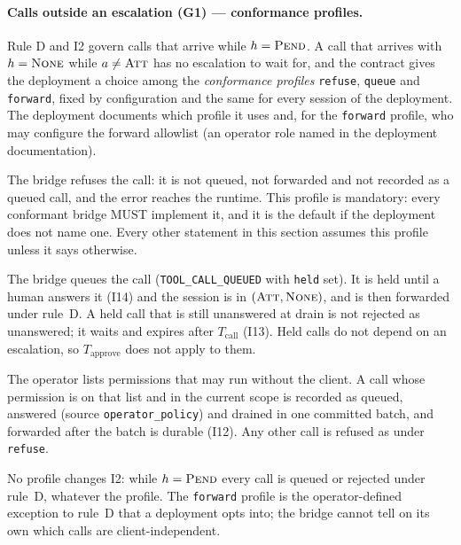 \paragraph{Calls outside an escalation (G1) --- conformance profiles.}
Rule D and I2 govern calls
that arrive while $h=\textsc{Pend}$. A call that arrives with
$h=\textsc{None}$ while $a\neq\textsc{Att}$ has no escalation to wait for,
and the contract gives the deployment a choice among the
\emph{conformance profiles} \texttt{refuse}, \texttt{queue} and
\texttt{forward}, fixed by configuration
and the same for every session of the deployment. The deployment
documents which profile it uses and, for the \texttt{forward} profile,
who may configure the forward allowlist (an operator role named in the
deployment documentation).
\begin{description}[leftmargin=2em]
\item[\texttt{refuse} (mandatory default).] The bridge refuses the call: it is not
queued, not forwarded and not recorded as a queued call, and the error
reaches the runtime. This profile is mandatory: every conformant
bridge MUST implement it, and it is the default if the deployment does
not name one. Every other statement in
this section assumes this profile unless it says otherwise.
\item[\texttt{queue} (optional).] The bridge queues the call
(\texttt{TOOL\_CALL\_QUEUED} with \texttt{held} set). It is held until a
human answers it (I14) and the session is in $(\textsc{Att},\textsc{None})$,
and is then forwarded under rule~D. A held call that is still unanswered
at drain is not rejected as unanswered; it waits and expires after
$T_{\text{call}}$ (I13). Held calls do not depend on an escalation, so
$T_{\text{approve}}$ does not apply to them.
\item[\texttt{forward} (optional).] The operator lists permissions that may run
without the client. A call whose permission is on that list and in the
current scope is recorded as queued, answered (source
\texttt{operator\_policy}) and drained in one committed batch, and
forwarded after the batch is durable (I12). Any other call is refused as
under \texttt{refuse}.
\end{description}
No profile changes I2: while $h=\textsc{Pend}$ every call is queued or
rejected under rule~D, whatever the profile. The \texttt{forward} profile
is the operator-defined exception to rule~D that a deployment opts into;
the bridge cannot tell on its own which calls are client-independent.

